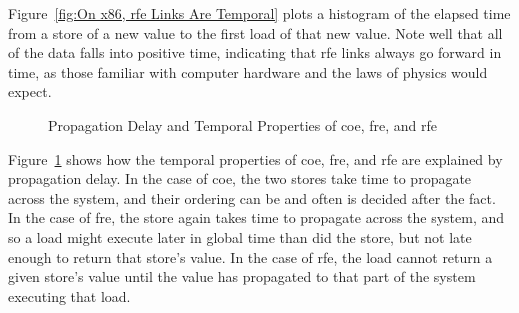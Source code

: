 \documentclass[10]{article}
\begin{document}
Figure~\ref{fig:On x86, rfe Links Are Temporal}
plots a histogram of the elapsed time from a store of a new value
to the first load of that new value.
Note well that all of the data falls into positive time, indicating
that rfe links always go forward in time, as those familiar with
computer hardware and the laws of physics would expect.

\begin{figure}[tb]
\begin{center}
\caption{Propagation Delay and Temporal Properties of coe, fre, and rfe}
\label{fig:Propagation Delay and Temporal Properties of coe, fre, and rfe}
\end{center}
\end{figure}

Figure~\ref{fig:Propagation Delay and Temporal Properties of coe, fre, and rfe}
shows how the temporal properties of coe, fre, and rfe are explained
by propagation delay.
In the case of coe, the two stores take time to propagate across the
system, and their ordering can be and often is decided after the fact.
In the case of fre, the store again takes time to propagate across
the system, and so a load might execute later in global time than
did the store, but not late enough to return that store's value.
In the case of rfe, the load cannot return a given store's value until
the value has propagated to that part of the system executing that load.
\end{document}
